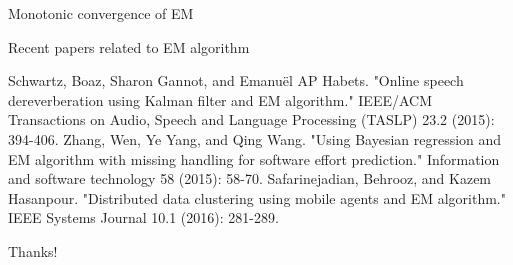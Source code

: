 \documentclass[12pt]{beamer}
\begin{document}
\begin{frame}{Monotonic convergence of EM}
\end{frame}

\begin{frame}{Recent papers related to EM algorithm}

\begin{thebibliography}{4}
 Schwartz, Boaz, Sharon Gannot, and Emanuël AP Habets. "Online speech dereverberation using Kalman filter and EM algorithm." IEEE/ACM Transactions on Audio, Speech and Language Processing (TASLP) 23.2 (2015): 394-406.
 Zhang, Wen, Ye Yang, and Qing Wang. "Using Bayesian regression and EM algorithm with missing handling for software effort prediction." Information and software technology 58 (2015): 58-70.
 Safarinejadian, Behrooz, and Kazem Hasanpour. "Distributed data clustering using mobile agents and EM algorithm." IEEE Systems Journal 10.1 (2016): 281-289.
\end{thebibliography}
\end{frame}

{
\begin{frame}[standout]
\Huge{Thanks!}
\end{frame}
}
\end{document}
